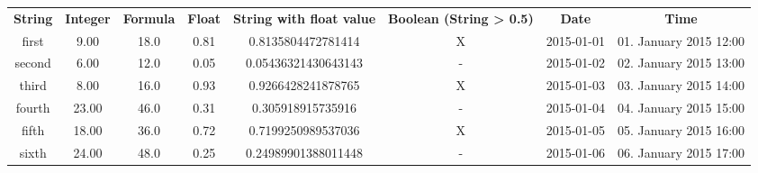 \begin{tabular}{c|c|c|c|c|c|c|c|}
\textbf{String} & \textbf{Integer} & \textbf{Formula} & \textbf{Float} & \textbf{String with float value} & \textbf{Boolean (String \textgreater{} 0.5)} & \textbf{Date} & \textbf{Time}\\
first & 9.00 & 18.0 & 0.81 & 0.8135804472781414 & X & 2015-01-01 & 01. January 2015 12:00\\
second & 6.00 & 12.0 & 0.05 & 0.05436321430643143 & - & 2015-01-02 & 02. January 2015 13:00\\
third & 8.00 & 16.0 & 0.93 & 0.9266428241878765 & X & 2015-01-03 & 03. January 2015 14:00\\
fourth & 23.00 & 46.0 & 0.31 & 0.305918915735916 & - & 2015-01-04 & 04. January 2015 15:00\\
fifth & 18.00 & 36.0 & 0.72 & 0.7199250989537036 & X & 2015-01-05 & 05. January 2015 16:00\\
sixth & 24.00 & 48.0 & 0.25 & 0.24989901388011448 & - & 2015-01-06 & 06. January 2015 17:00
\end{tabular}